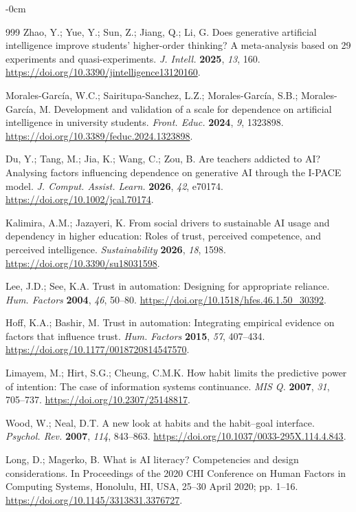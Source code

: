 \documentclass[sustainability,article,accept,moreauthors]{Definitions/mdpi}
\begin{document}
\begin{adjustwidth}{-\extralength}{0cm}
\begin{thebibliography}{999}
Zhao, Y.; Yue, Y.; Sun, Z.; Jiang, Q.; Li, G. Does generative artificial intelligence improve students' higher-order thinking? A meta-analysis based on 29 experiments and quasi-experiments. \textit{J. Intell.} \textbf{2025}, \textit{13}, 160. \url{https://doi.org/10.3390/jintelligence13120160}.

Morales-Garc{\'i}a, W.C.; Sairitupa-Sanchez, L.Z.; Morales-Garc{\'i}a, S.B.; Morales-Garc{\'i}a, M. Development and validation of a scale for dependence on artificial intelligence in university students. \textit{Front. Educ.} \textbf{2024}, \textit{9}, 1323898. \url{https://doi.org/10.3389/feduc.2024.1323898}.

Du, Y.; Tang, M.; Jia, K.; Wang, C.; Zou, B. Are teachers addicted to AI? Analysing factors influencing dependence on generative AI through the I-PACE model. \textit{J. Comput. Assist. Learn.} \textbf{2026}, \textit{42}, e70174. \url{https://doi.org/10.1002/jcal.70174}.

Kalimira, A.M.; Jazayeri, K. From social drivers to sustainable AI usage and dependency in higher education: Roles of trust, perceived competence, and perceived intelligence. \textit{Sustainability} \textbf{2026}, \textit{18}, 1598. \url{https://doi.org/10.3390/su18031598}.

Lee, J.D.; See, K.A. Trust in automation: Designing for appropriate reliance. \textit{Hum. Factors} \textbf{2004}, \textit{46}, 50--80. \url{https://doi.org/10.1518/hfes.46.1.50_30392}.

Hoff, K.A.; Bashir, M. Trust in automation: Integrating empirical evidence on factors that influence trust. \textit{Hum. Factors} \textbf{2015}, \textit{57}, 407--434. \url{https://doi.org/10.1177/0018720814547570}.

Limayem, M.; Hirt, S.G.; Cheung, C.M.K. How habit limits the predictive power of intention: The case of information systems continuance. \textit{MIS Q.} \textbf{2007}, \textit{31}, 705--737. \url{https://doi.org/10.2307/25148817}.

Wood, W.; Neal, D.T. A new look at habits and the habit--goal interface. \textit{Psychol. Rev.} \textbf{2007}, \textit{114}, 843--863. \url{https://doi.org/10.1037/0033-295X.114.4.843}.

Long, D.; Magerko, B. What is AI literacy? Competencies and design considerations. In {Proceedings of the 2020 CHI Conference on Human Factors in Computing Systems}, Honolulu, HI, USA, 25--30 April 2020; pp. 1--16. \url{https://doi.org/10.1145/3313831.3376727}.


\end{thebibliography}
\end{adjustwidth}
\end{document}
